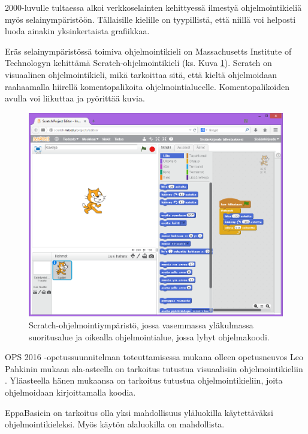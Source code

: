 2000-luvulle tultaessa alkoi
verkkoselainten kehittyessä
ilmestyä ohjelmointikieliä
myös selainympäristöön.
Tällaisille kielille on tyypillistä,
että niillä voi helposti luoda
ainakin yksinkertaista grafiikkaa.

Eräs selainympäristössä toimiva
ohjelmointikieli on Massachusetts
Institute of Technologyn kehittämä
Scratch-ohjelmointikieli
(ks. Kuva \ref{img:scratch}).
Scratch on visuaalinen ohjelmointikieli,
mikä tarkoittaa sitä, että
kieltä ohjelmoidaan raahaamalla
hiirellä komentopalikoita
ohjelmointialueelle.
Komentopalikoiden avulla
voi liikuttaa ja pyörittää
kuvia.

\begin{figure}[h]
    \centering
    \includegraphics[width=1\textwidth]{scratch}
    \caption{Scratch-ohjelmointiympäristö, jossa vasemmassa yläkulmassa suoritusalue ja oikealla ohjelmointialue, jossa lyhyt ohjelmakoodi.}
    \label{img:scratch}
\end{figure}


OPS 2016 -opetussuunnitelman
toteuttamisessa mukana olleen
opetusneuvos Leo Pahkinin mukaan
ala-asteella on tarkoitus tutustua
visuaalisiin ohjelmointikieliin
\cite{koodi2016_ops}.
Yläasteella hänen mukaansa
on tarkoitus tutustua
ohjelmointikieliin, joita
ohjelmoidaan kirjoittamalla koodia.

EppaBasicin on tarkoitus olla
yksi mahdollisuus yläluokilla
käytettäväksi ohjelmointikieleksi.
Myös käytön alaluokilla on
mahdollista.